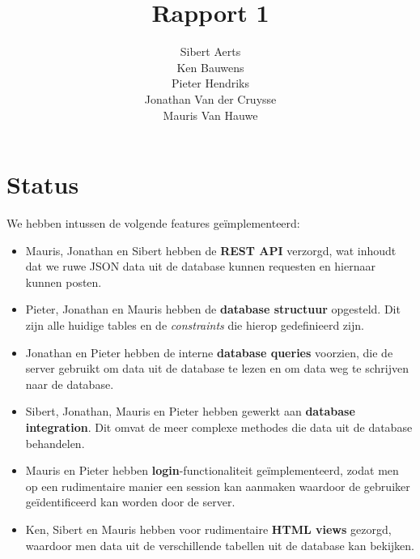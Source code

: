 \documentclass[12pt,a4paper,parskip=full]{article}
\begin{document}
\title{Rapport 1}
\author{Sibert Aerts \\ Ken Bauwens \\ Pieter Hendriks \\ Jonathan Van der Cruysse \\ Mauris Van Hauwe}
\maketitle

\newcommand{\code}[1]{\texttt{#1}}
% 
\newcommand{\CS}{{C\#}}
\lstset{language=[Sharp]C,basicstyle=\ttfamily}

\section{Status}

We hebben intussen de volgende features ge\"implementeerd:

\begin{itemize}

\item Mauris, Jonathan en Sibert hebben de \textbf{REST API} verzorgd, wat 
inhoudt dat we ruwe JSON data uit de database kunnen requesten en hiernaar 
kunnen posten.

\item Pieter, Jonathan en Mauris hebben de \textbf{database structuur} 
opgesteld. Dit zijn alle huidige tables en de \textit{constraints} die hierop
gedefinieerd zijn.

\item Jonathan en Pieter hebben de interne \textbf{database queries} voorzien, 
die de server gebruikt om data uit de database te lezen en om data weg te 
schrijven naar de database.

\item Sibert, Jonathan, Mauris en Pieter hebben gewerkt aan \textbf{database 
integration}. Dit omvat de meer complexe methodes die data uit de database 
behandelen.

\item Mauris en Pieter hebben \textbf{login}-functionaliteit ge\"implementeerd, 
zodat men op een rudimentaire manier een session kan aanmaken waardoor de 
gebruiker ge\"identificeerd kan worden door de server. 

\item Ken, Sibert en Mauris hebben voor rudimentaire \textbf{HTML views} 
gezorgd, waardoor men data uit de verschillende tabellen uit de database kan 
bekijken.

\end{itemize}
\end{document}
